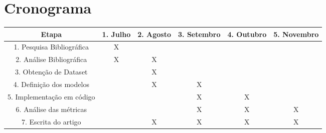 \chapter{Cronograma}
\begin{table}[h]
	\begin{tcolorbox}[width=\textwidth]
	\centering
	\renewcommand{\arraystretch}{1.5}
	\begin{adjustbox}{width=\textwidth}
	\begin{tabular}{|c|c|c|c|c|c|}
		\hline
		\textbf{Etapa} & 
		\textbf{1. Julho} & 
		\textbf{2. Agosto} & 
		\textbf{3. Setembro} & 
		\textbf{4. Outubro} & 
		\textbf{5. Novembro} \\ \hline
		1. Pesquisa Bibliográfica & X & &  &  &  \\ \hline
		2. Análise Bibliográfica & X & X &  &  &  \\ \hline
		3. Obtenção de Dataset &  & X &  &  &  \\ \hline
		4. Definição dos modelos &  & X & X &  &  \\ \hline
		5. Implementação em código &  &  & X & X &  \\ \hline
		6. Análise das métricas &  &  & X & X & X \\ \hline
		7. Escrita do artigo &  & X & X & X & X \\ \hline
	\end{tabular}
\end{adjustbox}
\end{tcolorbox}
\end{table}